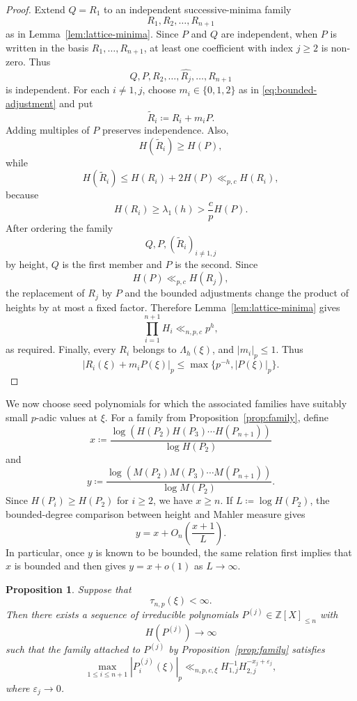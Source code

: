 \documentclass[10pt,a4paper]{amsart}
\newtheorem{proposition}[theorem]{Proposition}
\newcommand{\Z}{\mathbb Z}
\begin{document}
\begin{proof}
Extend $Q=R_1$ to an independent successive-minima family
$$
R_1,R_2,\ldots,R_{n+1}
$$
as in Lemma~\ref{lem:lattice-minima}. Since $P$ and $Q$ are independent, when $P$ is written in the basis $R_1,\ldots,R_{n+1}$, at least one coefficient with index $j\geq2$ is non-zero. Thus
$$
Q,P,R_2,\ldots,\widehat{R_j},\ldots,R_{n+1}
$$
is independent. For each $i\neq1,j$, choose $m_i\in\{0,1,2\}$ as in
\eqref{eq:bounded-adjustment} and put
$$
\widetilde R_i\coloneqq R_i+m_iP.
$$
Adding multiples of $P$ preserves independence. Also,
$$
H(\widetilde R_i)\geq H(P),
$$
while
$$
H(\widetilde R_i)
\leq H(R_i)+2H(P)
\ll_{p,c}H(R_i),
$$
because
$$
H(R_i)\geq\lambda_1(h)>\frac{c}{p}H(P).
$$
After ordering the family
$$
Q,P,(\widetilde R_i)_{i\neq1,j}
$$
by height, $Q$ is the first member and $P$ is the second. Since
$$
H(P)\ll_{p,c}H(R_j),
$$
the replacement of $R_j$ by $P$ and the bounded adjustments change the product of heights by at most a fixed factor. Therefore Lemma~\ref{lem:lattice-minima} gives
$$
\prod_{i=1}^{n+1}H_i\ll_{n,p,c}p^h,
$$
as required. Finally, every $R_i$ belongs to $\Lambda_h(\xi)$, and $|m_i|_p\leq1$. Thus
$$
|R_i(\xi)+m_iP(\xi)|_p
\leq\max\{p^{-h},|P(\xi)|_p\}.
$$
\end{proof}


We now choose seed polynomials for which the associated families have suitably small $p$-adic
values at $\xi$. For a family from
Proposition~\ref{prop:family}, define
$$
x\coloneqq
\frac{\log(H(P_2)H(P_3)\cdots H(P_{n+1}))}{\log H(P_2)}
$$
and
$$
y\coloneqq
\frac{\log(M(P_2)M(P_3)\cdots M(P_{n+1}))}{\log M(P_2)}.
$$
Since $H(P_i)\geq H(P_2)$ for $i\geq2$, we have $x\geq n$.
If $L\coloneqq\log H(P_2)$, the bounded-degree comparison between height and Mahler measure gives
\begin{equation}\label{eq:x-y-comparison}
y=x+O_n\left(\frac{x+1}{L}\right).
\end{equation}
In particular, once $y$ is known to be bounded, the same relation first implies that $x$ is bounded and then gives $y=x+o(1)$ as $L\to\infty$.

\begin{proposition}\label{prop:good-seeds}
Suppose that
$$
\tau_{n,p}(\xi)<\infty.
$$
Then there exists a sequence of irreducible polynomials
$P^{(j)}\in\Z[X]_{\leq n}$ with
$$
H(P^{(j)})\longrightarrow\infty
$$
such that the family attached to $P^{(j)}$ by Proposition~\ref{prop:family} satisfies
$$
\max_{1\leq i\leq n+1}|P_i^{(j)}(\xi)|_p
\ll_{n,p,c,\xi}
H_{1,j}^{-1}H_{2,j}^{-x_j+\varepsilon_j},
$$
where $\varepsilon_j\to0$.
\end{proposition}
\end{document}
